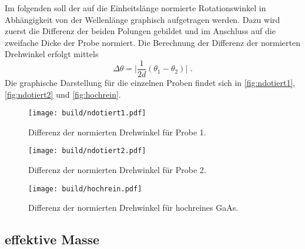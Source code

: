 Im folgenden soll der auf die Einheitslänge normierte Rotationswinkel in Abhängigkeit von der Wellenlänge graphisch aufgetragen werden. Dazu 
wird zuerst die Differenz der beiden Polungen gebildet und im Anschluss auf die zweifache Dicke der Probe normiert. 
Die Berechnung der Differenz der normierten Drehwinkel erfolgt mittels
\begin{equation*}
    \Delta \theta = \lvert \frac{1}{2d}(\theta_1 - \theta_2) \rvert \,\, .
\end{equation*}
Die graphische Darstellung für die einzelnen Proben findet sich in \autoref{fig:ndotiert1}, \autoref{fig:ndotiert2} und \autoref{fig:hochrein}.
\begin{figure}[H]
    \centering
    \texttt{[image: build/ndotiert1.pdf]}
    \caption{Differenz der normierten Drehwinkel für Probe 1.}
    \label{fig:ndotiert1}
\end{figure}

\begin{figure}[H]
    \centering
    \texttt{[image: build/ndotiert2.pdf]}
    \caption{Differenz der normierten Drehwinkel für Probe 2.}
    \label{fig:ndotiert2}
\end{figure}

\begin{figure}[H]
    \centering
    \texttt{[image: build/hochrein.pdf]}
    \caption{Differenz der normierten Drehwinkel für hochreines GaAs.}
    \label{fig:hochrein}
\end{figure}

\subsection{effektive Masse}